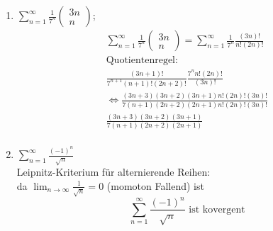 \documentclass{HM}
\begin{document}
\begin{enumerate}
\begin{enumerate}
\item $\sum\limits_{n=1}^\infty\frac{1}{7^n}\begin{pmatrix}
3n\\
n
\end{pmatrix}$;\\
\begin{align*}
	\sum\limits_{n=1}^\infty\frac{1}{7^n}\begin{pmatrix}
		3n\\
		n
	\end{pmatrix} = \sum\limits_{n=1}^\infty\frac{1}{7^n} \frac{(3n)!}{n!(2n)!}\\
	\text{Quotientenregel:}\\
	\frac{(3n+1)!}{7^{n+1}(n+1)!(2n+2)!}\frac{7^nn!(2n)!}{(3n)!}\\
	\Leftrightarrow \frac{(3n+3)(3n+2)(3n+1)n!(2n)!(3n)!}{7(n+1)(2n+2)(2n+1)n!(2n)!(3n)!}\\
	\frac{(3n+3)(3n+2)(3n+1)}{7(n+1)(2n+2)(2n+1)}\\
	\end{align*}
\item $\sum\limits_{n=1}^\infty\frac{(-1)^n}{\sqrt{n}}$\\
Leipnitz-Kriterium für alternierende Reihen:\\
da $\lim_{n\to\infty} \frac{1}{\sqrt{n}} = 0$ (momoton Fallend) ist $$\sum\limits_{n=1}^\infty\frac{(-1)^n}{\sqrt{n}}\text{ ist kovergent}$$ 

\end{enumerate}

\end{enumerate}
\end{document}
